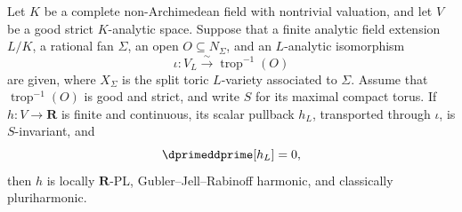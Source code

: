 
\begin{corollary}
\label{cor:p062-finite-split-invariant-scalar-stable-zero-current}
Let \(K\) be a complete non-Archimedean field with nontrivial valuation, and
let \(V\) be a good strict \(K\)-analytic space.  Suppose that a finite
analytic field extension \(L/K\), a rational fan \(\Sigma\), an open
\(O\subseteq N_\Sigma\), and an \(L\)-analytic isomorphism
\[
          \iota:V_L\xrightarrow{\sim}\operatorname{trop}^{-1}(O)
\]
are given, where \(X_\Sigma\) is the split toric \(L\)-variety associated to
\(\Sigma\).  Assume that \(\operatorname{trop}^{-1}(O)\) is good and
strict, and write \(S\) for its maximal compact torus.  If
\(h:V\to\mathbf R\) is finite and continuous, its scalar pullback \(h_L\),
transported through \(\iota\), is \(S\)-invariant, and
\[
                         \dprimeddprime[h_L]=0,
\]
then \(h\) is locally \(\mathbf R\)-PL, Gubler--Jell--Rabinoff harmonic,
and classically pluriharmonic.
\end{corollary}
